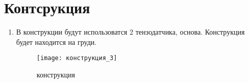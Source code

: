 \section{Контсрукция}
\begin{enumerate}

\item В конструкции будут использоватся 2 тензодатчика, основа. Конструкция будет находится на груди.

	\begin{figure}[h]
		\centering
		\texttt{[image: конструкция\_3]}
		\caption{конструкция}
	\end{figure}

\end{enumerate} 
